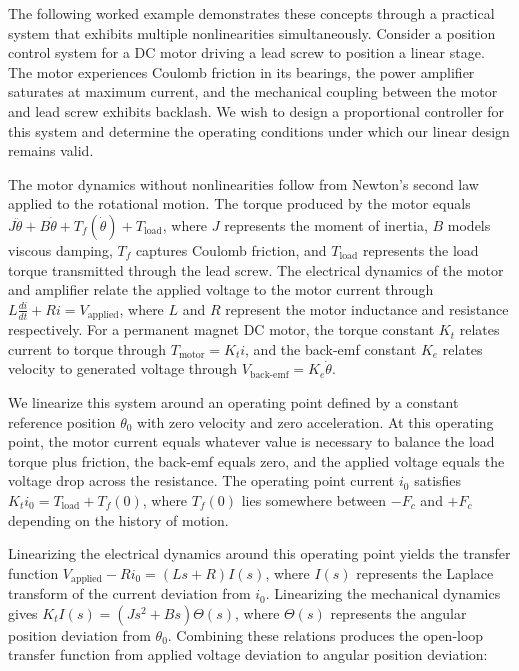 The following worked example demonstrates these concepts through a practical system that exhibits multiple nonlinearities simultaneously. Consider a position control system for a DC motor driving a lead screw to position a linear stage. The motor experiences Coulomb friction in its bearings, the power amplifier saturates at maximum current, and the mechanical coupling between the motor and lead screw exhibits backlash. We wish to design a proportional controller for this system and determine the operating conditions under which our linear design remains valid.

The motor dynamics without nonlinearities follow from Newton's second law applied to the rotational motion. The torque produced by the motor equals $J\ddot{\theta} + B\dot{\theta} + T_f(\dot{\theta}) + T_{\text{load}}$, where $J$ represents the moment of inertia, $B$ models viscous damping, $T_f$ captures Coulomb friction, and $T_{\text{load}}$ represents the load torque transmitted through the lead screw. The electrical dynamics of the motor and amplifier relate the applied voltage to the motor current through $L\frac{di}{dt} + Ri = V_{\text{applied}}$, where $L$ and $R$ represent the motor inductance and resistance respectively. For a permanent magnet DC motor, the torque constant $K_t$ relates current to torque through $T_{\text{motor}} = K_t i$, and the back-emf constant $K_e$ relates velocity to generated voltage through $V_{\text{back-emf}} = K_e \dot{\theta}$.

We linearize this system around an operating point defined by a constant reference position $\theta_0$ with zero velocity and zero acceleration. At this operating point, the motor current equals whatever value is necessary to balance the load torque plus friction, the back-emf equals zero, and the applied voltage equals the voltage drop across the resistance. The operating point current $i_0$ satisfies $K_t i_0 = T_{\text{load}} + T_f(0)$, where $T_f(0)$ lies somewhere between $-F_c$ and $+F_c$ depending on the history of motion.

Linearizing the electrical dynamics around this operating point yields the transfer function $V_{\text{applied}} - Ri_0 = (L s + R) I(s)$, where $I(s)$ represents the Laplace transform of the current deviation from $i_0$. Linearizing the mechanical dynamics gives $K_t I(s) = (J s^2 + B s) \Theta(s)$, where $\Theta(s)$ represents the angular position deviation from $\theta_0$. Combining these relations produces the open-loop transfer function from applied voltage deviation to angular position deviation:

